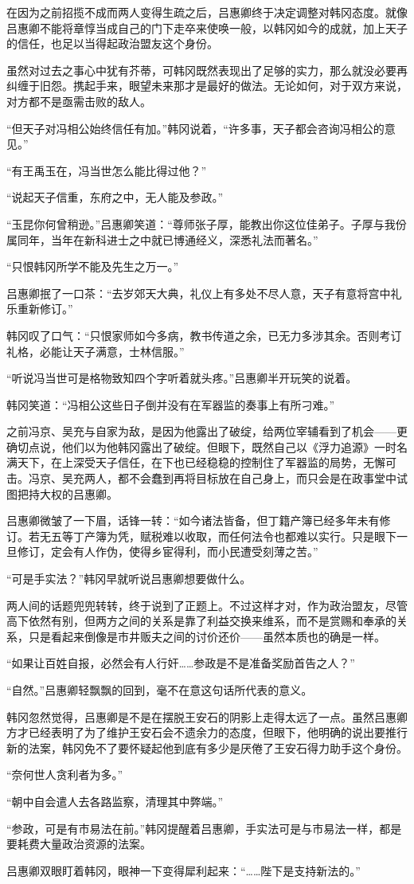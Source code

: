 在因为之前招揽不成而两人变得生疏之后，吕惠卿终于决定调整对韩冈态度。就像吕惠卿不能将章惇当成自己的门下走卒来使唤一般，以韩冈如今的成就，加上天子的信任，也足以当得起政治盟友这个身份。

虽然对过去之事心中犹有芥蒂，可韩冈既然表现出了足够的实力，那么就没必要再纠缠于旧怨。携起手来，眼望未来那才是最好的做法。无论如何，对于双方来说，对方都不是亟需击败的敌人。

“但天子对冯相公始终信任有加。”韩冈说着，“许多事，天子都会咨询冯相公的意见。”

“有王禹玉在，冯当世怎么能比得过他？”

“说起天子信重，东府之中，无人能及参政。”

“玉昆你何曾稍逊。”吕惠卿笑道：“尊师张子厚，能教出你这位佳弟子。子厚与我份属同年，当年在新科进士之中就已博通经义，深悉礼法而著名。”

“只恨韩冈所学不能及先生之万一。”

吕惠卿抿了一口茶：“去岁郊天大典，礼仪上有多处不尽人意，天子有意将宫中礼乐重新修订。”

韩冈叹了口气：“只恨家师如今多病，教书传道之余，已无力多涉其余。否则考订礼格，必能让天子满意，士林信服。”

“听说冯当世可是格物致知四个字听着就头疼。”吕惠卿半开玩笑的说着。

韩冈笑道：“冯相公这些日子倒并没有在军器监的奏事上有所刁难。”

之前冯京、吴充与自家为敌，是因为他露出了破绽，给两位宰辅看到了机会——更确切点说，他们以为他韩冈露出了破绽。但眼下，既然自己以《浮力追源》一时名满天下，在上深受天子信任，在下也已经稳稳的控制住了军器监的局势，无懈可击。冯京、吴充两人，都不会蠢到再将目标放在自己身上，而只会是在政事堂中试图把持大权的吕惠卿。

吕惠卿微皱了一下眉，话锋一转：“如今诸法皆备，但丁籍产簿已经多年未有修订。若无五等丁产簿为凭，赋税难以收取，而任何法令也都难以实行。只是眼下一旦修订，定会有人作伪，使得乡宦得利，而小民遭受刻薄之苦。”

“可是手实法？”韩冈早就听说吕惠卿想要做什么。

两人间的话题兜兜转转，终于说到了正题上。不过这样才对，作为政治盟友，尽管高下依然有别，但两方之间的关系是靠了利益交换来维系，而不是赏赐和奉承的关系，只是看起来倒像是市井贩夫之间的讨价还价——虽然本质也的确是一样。

“如果让百姓自报，必然会有人行奸……参政是不是准备奖励首告之人？”

“自然。”吕惠卿轻飘飘的回到，毫不在意这句话所代表的意义。

韩冈忽然觉得，吕惠卿是不是在摆脱王安石的阴影上走得太远了一点。虽然吕惠卿方才已经表明了为了维护王安石会不遗余力的态度，但眼下，他明确的说出要推行新的法案，韩冈免不了要怀疑起他到底有多少是厌倦了王安石得力助手这个身份。

“奈何世人贪利者为多。”

“朝中自会遣人去各路监察，清理其中弊端。”

“参政，可是有市易法在前。”韩冈提醒着吕惠卿，手实法可是与市易法一样，都是要耗费大量政治资源的法案。

吕惠卿双眼盯着韩冈，眼神一下变得犀利起来：“……陛下是支持新法的。”

